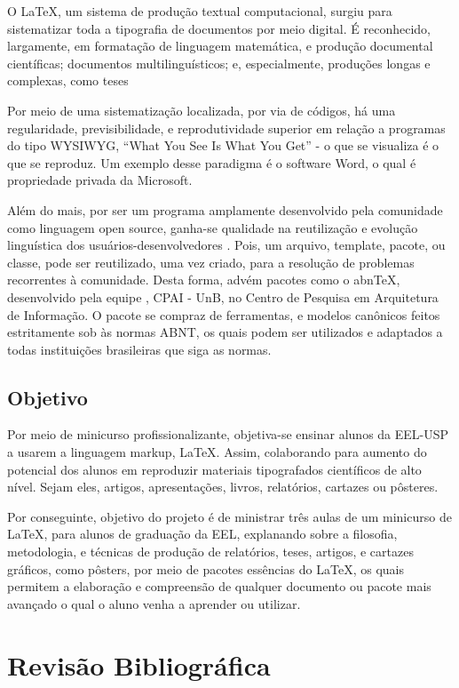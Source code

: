 \documentclass[
12pt,				%
openright,			%
oneside,			%
a4paper,			%
english,			%
french,				%
spanish,			%
brazil,				%
]{abntex2}
\begin{document}
O \LaTeX, um sistema de produção textual computacional, surgiu para
sistematizar toda a tipografia de documentos por meio digital. É
reconhecido, largamente, em formatação de linguagem matemática, e
produção documental científicas; documentos multilinguísticos; e,
especialmente, produções longas e complexas, como teses
\cite{ignat2005}

Por meio de uma sistematização localizada, por via de códigos, há uma
regularidade, previsibilidade, e reprodutividade superior em relação a
programas do tipo WYSIWYG, ``What You See Is What You Get'' - o que se
visualiza é o que se reproduz. Um exemplo desse paradigma é o software
Word, o qual é propriedade privada da Microsoft.

Além do mais, por ser um programa amplamente desenvolvido pela
comunidade como linguagem open source, ganha-se qualidade na
reutilização e evolução linguística dos usuários-desenvolvedores
\cite{goossens1994}. Pois, um arquivo, template, pacote, ou classe,
pode ser reutilizado, uma vez criado, para a resolução de problemas
recorrentes à comunidade. Desta forma, advém pacotes como o abnTeX,
desenvolvido pela equipe \abnTeX, CPAI - UnB, no Centro de Pesquisa em
Arquitetura de Informação. O pacote se compraz de ferramentas, e
modelos canônicos feitos estritamente sob às normas ABNT, os quais
podem ser utilizados e adaptados a todas instituições brasileiras que
siga as normas.


\section{Objetivo}

Por meio de minicurso profissionalizante, objetiva-se ensinar alunos da
EEL-USP a usarem a linguagem markup, \LaTeX. Assim, colaborando para
aumento do potencial dos alunos em reproduzir materiais tipografados
científicos de alto nível. Sejam eles, artigos, apresentações, livros,
relatórios, cartazes ou pôsteres.

Por conseguinte, objetivo do projeto é de ministrar três aulas de um minicurso de
\LaTeX, para alunos de graduação da EEL, explanando sobre a filosofia,
metodologia, e técnicas de produção de relatórios, teses, artigos, e
cartazes gráficos, como pôsters, por meio de pacotes essências do
\LaTeX, os quais permitem a elaboração e compreensão de qualquer
documento ou pacote mais avançado o qual o aluno venha a aprender ou utilizar.

\chapter{Revisão Bibliográfica}
\end{document}
